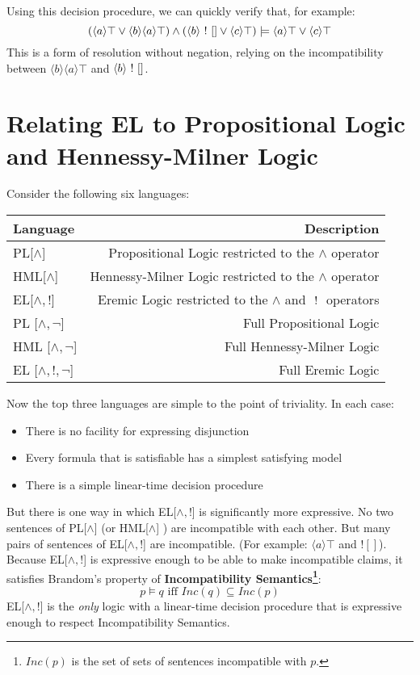 Using this decision procedure, we can quickly verify that, for example:
\[
(\langle a \rangle \top \lor \langle b \rangle \langle a \rangle \top ) \land (\langle b \rangle \ ! \  [] \lor \langle c \rangle \top) \models \langle a \rangle \top \lor \langle c \rangle \top
\]
This is a form of resolution without negation, relying on the incompatibility between $\langle b \rangle \langle a \rangle \top$ and $\langle b \rangle \ ! \  []$.

\section{Relating EL to Propositional Logic and Hennessy-Milner Logic}
Consider the following six languages:
\begin{center}
\begin{tabular}{ l | r }
Language & Description \\
\hline
PL[$\land$] & Propositional Logic restricted to the $\land$ operator \\
HML[$\land$] & Hennessy-Milner Logic restricted to the $\land$ operator \\
EL[$\land, !$] & Eremic Logic restricted to the $\land$ and $\ ! \ $ operators \\
PL [$\land, \neg$] & Full Propositional Logic \\
HML [$\land, \neg$] & Full Hennessy-Milner Logic \\
EL [$\land, !, \neg$] & Full Eremic Logic \\
\end{tabular}
\end{center}
Now the top three languages are simple to the point of triviality. In each case:
\begin{itemize}
\item
There is no facility for expressing disjunction
\item
Every formula that is satisfiable has a simplest satisfying model
\item
There is a simple linear-time decision procedure
\end{itemize}
But there is one way in which EL[$\land, !$]  is significantly more expressive.
No two sentences of PL[$\land$] (or HML[$\land$] ) are incompatible with each other. 
But many pairs of sentences of EL[$\land, !$] are incompatible.
(For example: $\langle a \rangle \top$ and $! []$). 
Because EL[$\land, !$]  is expressive enough to be able to make incompatible claims, it satisfies Brandom's property of {\bf Incompatibility Semantics\footnote{$Inc(p)$ is the set of sets of sentences incompatible with $p$.}}:
\[
p \models q \mbox{ iff } Inc(q) \subseteq Inc(p)
\]
EL[$\land, !$]  is the \emph{only} logic with a linear-time decision procedure that is expressive enough to respect Incompatibility Semantics.

